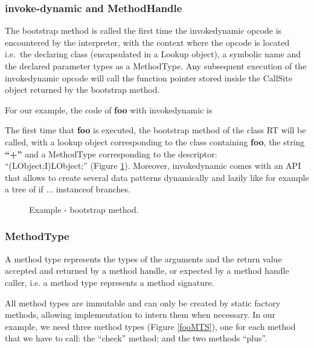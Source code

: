\documentclass{sig-alternate}
\begin{document}
    \subsubsection{invoke-dynamic and MethodHandle}

      The bootstrap method is called the first time the invokedynamic opcode is encountered by the interpreter,
      with the context where the opcode is located i.e.~the declaring class (encapsulated in a Lookup object),
      a symbolic name and the declared parameter types as a MethodType.
      Any subsequent execution of the invokedynamic opcode will call the function pointer
      stored inside the CallSite object returned by the bootstrap method.
      
      For our example, the code of {\bf foo} with invokedynamic is

      

      The first time that {\bf foo} is executed, the bootstrap method of the class RT will be called, with a lookup object corresponding to the class containing {\bf foo},
      the string {\bf ``+''} and a MethodType corresponding to the descriptor:\\``(LObject;I)LObject;'' (Figure \ref{fooBSM}).
      Moreover, invokedynamic comes with an API that allows to create several data patterns
      dynamically and lazily like for example a tree of if ... instanceof branches.

      \begin{figure}[!h]
        \centering \vspace{-1.5em}
        \caption{Example - bootstrap method.}
        \label{fooBSM}
      \end{figure}

    \subsubsection{MethodType}

      A method type represents the types of the arguments and the return value accepted and returned by a method handle,
      or expected by a method handle caller, i.e. a method type represents a method signature.

      All method types are immutable and can only be created by static factory methods,
      allowing implementation to intern them when necessary. 
      In our example, we need three method types (Figure \ref{fooMTS}), one for each method that we have to call:
      the ``check'' method; and the two methods ``plus''.
\end{document}
